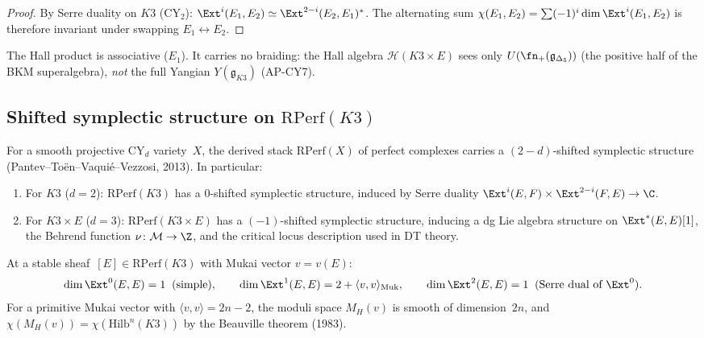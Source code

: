 \begin{proof}
By Serre duality on $K3$ (CY$_2$): $\Ext^i(E_1, E_2) \simeq \Ext^{2-i}(E_2, E_1)^*$.  The alternating sum $\chi(E_1, E_2) = \sum (-1)^i \dim \Ext^i(E_1, E_2)$ is therefore invariant under swapping $E_1 \leftrightarrow E_2$.
\end{proof}

\begin{remark}
\label{rem:k3e-hall-e1}
The Hall product is associative ($E_1$).  It carries no braiding: the Hall algebra $\mathcal{H}(K3 \times E)$ sees only $U(\fn_+(\mathfrak{g}_{\Delta_5}))$ (the positive half of the BKM superalgebra), \emph{not} the full Yangian $Y(\mathfrak{g}_{K3})$ (AP-CY7).
\end{remark}

\subsection{Shifted symplectic structure on $\mathrm{RPerf}(K3)$}
\label{subsec:k3e-ptvv}

\begin{proposition}
\label{prop:k3e-ptvv}
\ClaimStatusProvedElsewhere
For a smooth projective CY$_d$ variety~$X$, the derived stack $\mathrm{RPerf}(X)$ of perfect complexes carries a $(2-d)$-shifted symplectic structure \textup{(Pantev--To\"en--Vaqui\'e--Vezzosi, 2013)}.  In particular:
\begin{enumerate}[label=(\roman*)]
  \item For $K3$ ($d=2$): $\mathrm{RPerf}(K3)$ has a $0$-shifted symplectic structure, induced by Serre duality $\Ext^i(E,F) \times \Ext^{2-i}(F,E) \to \C$.
  \item For $K3 \times E$ ($d=3$): $\mathrm{RPerf}(K3 \times E)$ has a $(-1)$-shifted symplectic structure, inducing a dg Lie algebra structure on $\Ext^*(E,E)[1]$, the Behrend function $\nu \colon \mathcal{M} \to \Z$, and the critical locus description used in DT theory.
\end{enumerate}
\end{proposition}

\begin{remark}
\label{rem:k3e-tangent-rperf}
At a stable sheaf~$[E] \in \mathrm{RPerf}(K3)$ with Mukai vector $v = v(E)$:
\[
  \dim \Ext^0(E,E) = 1 \;\;(\text{simple}),\qquad
  \dim \Ext^1(E,E) = 2 + \langle v, v \rangle_{\mathrm{Muk}},\qquad
  \dim \Ext^2(E,E) = 1 \;\;(\text{Serre dual of }\Ext^0).
\]
For a primitive Mukai vector with $\langle v, v \rangle = 2n-2$, the moduli space $M_H(v)$ is smooth of dimension~$2n$, and $\chi(M_H(v)) = \chi(\mathrm{Hilb}^n(K3))$ by the Beauville theorem (1983).
\end{remark}

